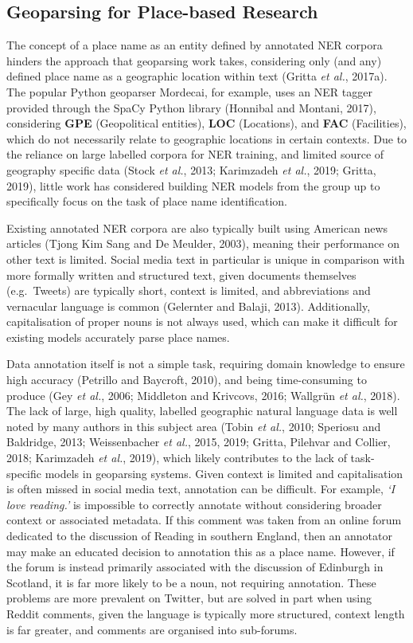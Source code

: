\documentclass[
  letterpaper,
  11pt,
  english,
  onehalfspacing,
  headsepline]{MastersDoctoralThesis}
\begin{document}
\hypertarget{geoparsing-for-place-based-research}{%
\subsection{Geoparsing for Place-based
Research}\label{geoparsing-for-place-based-research}}

The concept of a place name as an entity defined by annotated NER
corpora hinders the approach that geoparsing work takes, considering
only (and any) defined place name as a geographic location within text
(Gritta \emph{et al.}, 2017a). The popular Python geoparser Mordecai,
for example, uses an NER tagger provided through the SpaCy Python
library (Honnibal and Montani, 2017), considering \textbf{GPE}
(Geopolitical entities), \textbf{LOC} (Locations), and \textbf{FAC}
(Facilities), which do not necessarily relate to geographic locations in
certain contexts. Due to the reliance on large labelled corpora for NER
training, and limited source of geography specific data (Stock \emph{et
al.}, 2013; Karimzadeh \emph{et al.}, 2019; Gritta, 2019), little work
has considered building NER models from the group up to specifically
focus on the task of place name identification.

Existing annotated NER corpora are also typically built using American
news articles (Tjong Kim Sang and De Meulder, 2003), meaning their
performance on other text is limited. Social media text in particular is
unique in comparison with more formally written and structured text,
given documents themselves (e.g.~Tweets) are typically short, context is
limited, and abbreviations and vernacular language is common (Gelernter
and Balaji, 2013). Additionally, capitalisation of proper nouns is not
always used, which can make it difficult for existing models accurately
parse place names.

Data annotation itself is not a simple task, requiring domain knowledge
to ensure high accuracy (Petrillo and Baycroft, 2010), and being
time-consuming to produce (Gey \emph{et al.}, 2006; Middleton and
Krivcovs, 2016; Wallgrün \emph{et al.}, 2018). The lack of large, high
quality, labelled geographic natural language data is well noted by many
authors in this subject area (Tobin \emph{et al.}, 2010; Speriosu and
Baldridge, 2013; Weissenbacher \emph{et al.}, 2015, 2019; Gritta,
Pilehvar and Collier, 2018; Karimzadeh \emph{et al.}, 2019), which
likely contributes to the lack of task-specific models in geoparsing
systems. Given context is limited and capitalisation is often missed in
social media text, annotation can be difficult. For example, \emph{`I
love reading.'} is impossible to correctly annotate without considering
broader context or associated metadata. If this comment was taken from
an online forum dedicated to the discussion of Reading in southern
England, then an annotator may make an educated decision to annotation
this as a place name. However, if the forum is instead primarily
associated with the discussion of Edinburgh in Scotland, it is far more
likely to be a noun, not requiring annotation. These problems are more
prevalent on Twitter, but are solved in part when using Reddit comments,
given the language is typically more structured, context length is far
greater, and comments are organised into sub-forums.
\end{document}
